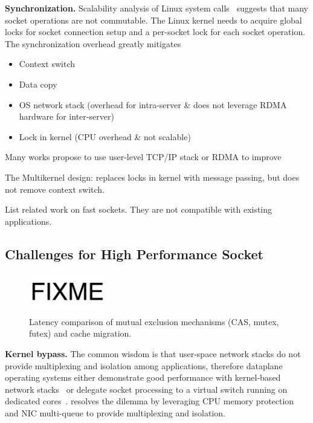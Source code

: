 \textbf{Synchronization.}
Scalability analysis of Linux system calls~\cite{boyd2010analysis} suggests that many socket operations are not commutable. The Linux kernel needs to acquire global locks for socket connection setup and a per-socket lock for each socket operation. The synchronization overhead greatly mitigates

\begin{itemize}
	\item Context switch
	\item Data copy
	\item OS network stack (overhead for intra-server \& does not leverage RDMA hardware for inter-server)
	\item Lock in kernel (CPU overhead \& not scalable)
\end{itemize}

Many works propose to use user-level TCP/IP stack  or RDMA  to improve




The Multikernel design: replaces locks in kernel with message passing, but does not remove context switch.

List related work on fast sockets. They are not compatible with existing applications.

\subsection{Challenges for High Performance Socket}
\label{subsec:challenges}

\begin{figure}[t]
	\centering
	\includegraphics[width=0.3\textwidth]{images/fixme}
	\caption{Latency comparison of mutual exclusion mechanisms (CAS, mutex, futex) and cache migration.}
	\label{fig:mutual-exclusion}
\end{figure}

\textbf{Kernel bypass.}
The common wisdom is that user-space network stacks do not provide multiplexing and isolation among applications, therefore dataplane operating systems either demonstrate good performance with kernel-based network stacks~\cite{belay2014ix,tsai2017lite} or delegate socket processing to a virtual switch running on dedicated cores~\cite{martins2014clickos,roghanchi2017ffwd}. \sys resolves the dilemma by leveraging CPU memory protection and NIC multi-queue to provide multiplexing and isolation.


